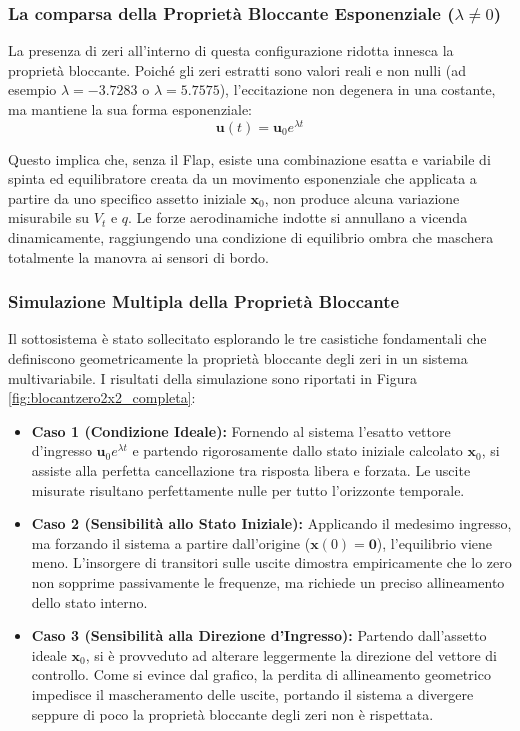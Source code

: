 \subsubsection{La comparsa della Proprietà Bloccante Esponenziale ($\lambda \neq 0$)}
La presenza di zeri all'interno di questa configurazione ridotta innesca la proprietà bloccante. Poiché gli zeri estratti sono valori reali e non nulli (ad esempio $\lambda = -3.7283$ o $\lambda = 5.7575$), l'eccitazione non degenera in una costante, ma mantiene la sua forma esponenziale:
\begin{equation}
	\mathbf{u}(t) = \mathbf{u}_0 e^{\lambda t} 
\end{equation}

Questo implica che, senza il Flap, esiste una combinazione esatta e variabile di spinta ed equilibratore creata da un movimento esponenziale che applicata a partire da uno specifico assetto iniziale $\mathbf{x}_0$, non produce alcuna variazione misurabile su $V_t$ e $q$. Le forze aerodinamiche indotte  si annullano a vicenda dinamicamente, raggiungendo una condizione di equilibrio ombra che maschera totalmente la manovra ai sensori di bordo.

\subsubsection{Simulazione Multipla della Proprietà Bloccante}

Il sottosistema \`e stato sollecitato esplorando le tre casistiche fondamentali che definiscono geometricamente la proprietà bloccante degli zeri in un sistema multivariabile. I risultati della simulazione sono riportati in Figura \ref{fig:blocantzero2x2_completa}:

\begin{itemize}
	\item \textbf{Caso 1 (Condizione Ideale):} Fornendo al sistema l'esatto vettore d'ingresso $\mathbf{u}_0 e^{\lambda t}$ e partendo rigorosamente dallo stato iniziale calcolato $\mathbf{x}_0$, si assiste alla perfetta cancellazione tra risposta libera e forzata. Le uscite misurate risultano perfettamente nulle per tutto l'orizzonte temporale.
	
	\item \textbf{Caso 2 (Sensibilità allo Stato Iniziale):} Applicando il medesimo ingresso, ma forzando il sistema a partire dall'origine ($\mathbf{x}(0) = \mathbf{0}$), l'equilibrio viene meno. L'insorgere di transitori sulle uscite dimostra empiricamente che lo zero non sopprime passivamente le frequenze, ma richiede un preciso allineamento dello stato interno.
	
	\item \textbf{Caso 3 (Sensibilità alla Direzione d'Ingresso):} Partendo dall'assetto ideale $\mathbf{x}_0$, si \`e provveduto ad alterare leggermente la direzione del vettore di controllo. Come si evince dal grafico, la perdita di allineamento geometrico impedisce il mascheramento delle uscite, portando il sistema a divergere seppure di poco la proprietà bloccante degli zeri non è rispettata.
\end{itemize}


